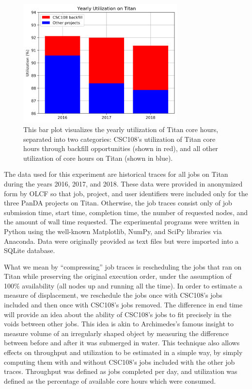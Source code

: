 \begin{figure}
  \includegraphics[width=0.75\textwidth]{images/barplot-jacks-slide.png}
\caption{This bar plot visualizes the yearly utilization of Titan core hours,
separated into two categories: CSC108's utilization of Titan core hours through
backfill opportunities (shown in red), and all other utilization of core hours
on Titan (shown in blue).}
\label{fig:jacks-slide}
\end{figure}

The data used for this experiment are historical traces for all jobs on Titan
during the years 2016, 2017, and 2018. These data were provided in anonymized
form by OLCF so that job, project, and user identifiers were included only for
the three PanDA projects on Titan. Otherwise, the job traces consist only of
job submission time, start time, completion time, the number of requested
nodes, and the amount of wall time requested. The experimental programs were
written in Python using the well-known Matplotlib, NumPy, and SciPy libraries
via Anaconda. Data were originally provided as text files but were imported
into a SQLite database.

What we mean by ``compressing'' job traces is rescheduling the jobs that ran
on Titan while preserving the original execution order, under the assumption of
100\% availability (all nodes up and running all the time). In order to
estimate a measure of displacement, we reschedule the jobs once with CSC108's
jobs included and then once with CSC108's jobs removed. The difference in end
time will provide an idea about the ability of CSC108's jobs to fit precisely
in the voids between other jobs. This idea is akin to Archimedes's famous
insight to measure volume of an irregularly shaped object by measuring the
difference between before and after it was submerged in water. This technique
also allows effects on throughput and utilization to be estimated in a simple
way, by simply computing them with and without CSC108's jobs included with the
other job traces. Throughput was defined as jobs completed per day, and
utilization was defined as the percentage of available core hours which were
consumed.

